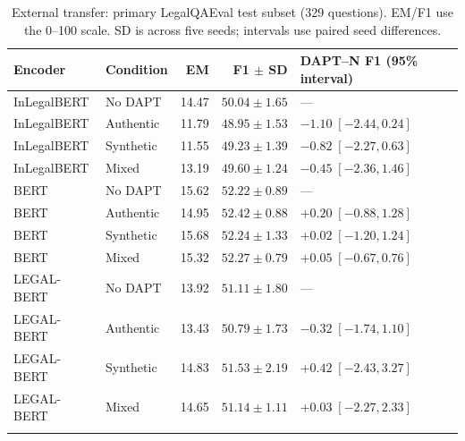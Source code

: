 \documentclass[pdflatex,sn-basic]{sn-jnl}
\begin{document}
\begin{table}[!htbp]
\caption{External transfer: primary LegalQAEval test subset (329 questions).
EM/F1 use the 0--100 scale. SD is across five seeds; intervals
use paired seed differences.}
\label{tab:legalqaeval_test}
\centering\scriptsize
\setlength{\tabcolsep}{3pt}
\begin{tabular}{@{}llrr>{\raggedright\arraybackslash}p{3.8cm}@{}}
\toprule
Encoder & Condition & EM & F1 $\pm$ SD & DAPT--N F1 (95\% interval) \\
\midrule
InLegalBERT & No DAPT & 14.47 & $50.04\pm1.65$ & --- \\
InLegalBERT & Authentic & 11.79 & $48.95\pm1.53$ & $-1.10\;[-2.44,0.24]$ \\
InLegalBERT & Synthetic & 11.55 & $49.23\pm1.39$ & $-0.82\;[-2.27,0.63]$ \\
InLegalBERT & Mixed & 13.19 & $49.60\pm1.24$ & $-0.45\;[-2.36,1.46]$ \\
\addlinespace
BERT & No DAPT & 15.62 & $52.22\pm0.89$ & --- \\
BERT & Authentic & 14.95 & $52.42\pm0.88$ & $+0.20\;[-0.88,1.28]$ \\
BERT & Synthetic & 15.68 & $52.24\pm1.33$ & $+0.02\;[-1.20,1.24]$ \\
BERT & Mixed & 15.32 & $52.27\pm0.79$ & $+0.05\;[-0.67,0.76]$ \\
\addlinespace
LEGAL-BERT & No DAPT & 13.92 & $51.11\pm1.80$ & --- \\
LEGAL-BERT & Authentic & 13.43 & $50.79\pm1.73$ & $-0.32\;[-1.74,1.10]$ \\
LEGAL-BERT & Synthetic & 14.83 & $51.53\pm2.19$ & $+0.42\;[-2.43,3.27]$ \\
LEGAL-BERT & Mixed & 14.65 & $51.14\pm1.11$ & $+0.03\;[-2.27,2.33]$ \\
\addlinespace
\bottomrule
\end{tabular}
\end{table}
\end{document}
